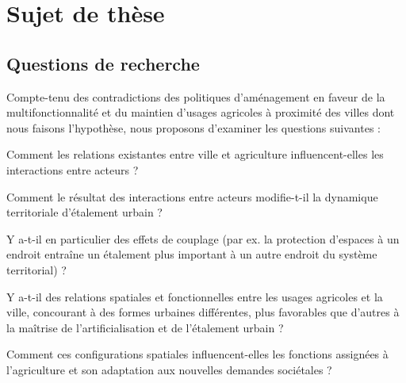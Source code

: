 \section{Sujet de thèse}

\subsection{Questions de recherche}

Compte-tenu des contradictions des politiques d'aménagement
en faveur de la multifonctionnalité et du maintien
d'usages agricoles à proximité des villes dont nous faisons l'hypothèse,
nous proposons d'examiner les questions suivantes :

\startitemize[n]


	

\item	Comment les relations existantes entre ville et agriculture
	influencent-elles les interactions entre acteurs ?

\item	Comment le résultat des interactions
	entre acteurs modifie-t-il la dynamique territoriale
	d'étalement urbain ?
	
	Y a-t-il en particulier des effets de couplage (par ex. la protection d'espaces à un endroit
	entraîne un étalement plus important à un autre endroit du système territorial) ?

\item	Y a-t-il des relations spatiales et fonctionnelles entre les usages agricoles
	et la ville, concourant à des formes urbaines différentes,
	plus favorables que d'autres à la maîtrise de l'artificialisation
	et de l'étalement urbain ?

\item	Comment ces configurations spatiales influencent-elles les fonctions
	assignées à l'agriculture et son adaptation aux nouvelles demandes sociétales ?
	

